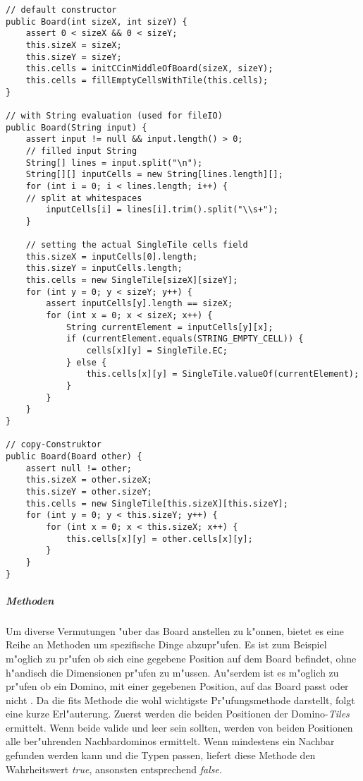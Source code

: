 \begin{lstlisting}[float,style=CodeHighlighting,caption=Board - Konstruktor,label=lst:board_konstruktor]
// default constructor
public Board(int sizeX, int sizeY) {
    assert 0 < sizeX && 0 < sizeY;
    this.sizeX = sizeX;
    this.sizeY = sizeY;
    this.cells = initCCinMiddleOfBoard(sizeX, sizeY);
    this.cells = fillEmptyCellsWithTile(this.cells);
}

// with String evaluation (used for fileIO)
public Board(String input) {
    assert input != null && input.length() > 0;
    // filled input String
    String[] lines = input.split("\n");
    String[][] inputCells = new String[lines.length][];
    for (int i = 0; i < lines.length; i++) {
    // split at whitespaces
        inputCells[i] = lines[i].trim().split("\\s+");
    }

    // setting the actual SingleTile cells field
    this.sizeX = inputCells[0].length;
    this.sizeY = inputCells.length;
    this.cells = new SingleTile[sizeX][sizeY];
    for (int y = 0; y < sizeY; y++) {
        assert inputCells[y].length == sizeX;
        for (int x = 0; x < sizeX; x++) {
            String currentElement = inputCells[y][x];
            if (currentElement.equals(STRING_EMPTY_CELL)) {
                cells[x][y] = SingleTile.EC;
            } else {
                this.cells[x][y] = SingleTile.valueOf(currentElement);
            }
        }
    }
}

// copy-Construktor
public Board(Board other) {
    assert null != other;
    this.sizeX = other.sizeX;
    this.sizeY = other.sizeY;
    this.cells = new SingleTile[this.sizeX][this.sizeY];
    for (int y = 0; y < this.sizeY; y++) {
        for (int x = 0; x < this.sizeX; x++) {
            this.cells[x][y] = other.cells[x][y];
        }
    }
}
\end{lstlisting}

\subparagraph{Methoden}
Um diverse Vermutungen "uber das Board anstellen zu k"onnen, bietet es eine Reihe an Methoden um spezifische Dinge abzupr"ufen. Es ist zum Beispiel m"oglich zu pr"ufen ob sich eine gegebene Position auf dem Board befindet, ohne h"andisch die Dimensionen pr"ufen zu m"ussen. Au"serdem ist es m"oglich zu pr"ufen ob ein Domino, mit einer gegebenen Position, auf das Board passt oder nicht . Da die fits Methode die wohl wichtigste Pr"ufungsmethode darstellt, folgt eine kurze Erl"auterung. Zuerst werden die beiden Positionen der Domino-\emph{Tiles} ermittelt. Wenn beide valide und leer sein sollten, werden von beiden Positionen alle ber"uhrenden Nachbardominos ermittelt. Wenn mindestens ein Nachbar gefunden werden kann und die Typen passen, liefert diese Methode den Wahrheitswert \emph{true}, ansonsten entsprechend \emph{false}. 

